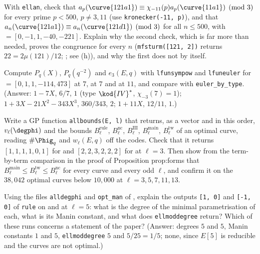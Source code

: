 \begin{sloppypar}
\begin{exercise}\label{exer:computation:sturm}
With \texttt{ellan}, check that $a_p(\curve{121a1})\equiv\chi_{-11}(p)a_p(\curve{11a1})\pmod3$ for every prime $p<500$, $p\ne3,11$ (use \texttt{kronecker(-11, p)}),
and that $a_n(\curve{121a1})\equiv a_n(\curve{121d1})\pmod3$ for all $n\le500$, with  $=[0,-1,1,-40,-221]$. Explain why the second check, which is far
more than needed, proves the congruence for every $n$ (\texttt{mfsturm([121, 2])} returns $22=2\mu(121)/12$; ; see (h)), and why the first does not by
itself.
\end{exercise}

\begin{exercise}\label{exer:computation:euler}
Compute $P_q(X)$, $P_q(q^{-2})$ and $e_3(E,q)$ with \texttt{lfunsympow} and \texttt{lfuneuler} for  $=[0,1,1,-114,473]$ at $7$,  at
$7$ and  at $11$, and compare with \texttt{euler\_by\_type}. (Answer: $1-7X$, $6/7$, $1$ (type $\kod{IV}^*$, $\chi_{-3}(7)=1$); $1+3X-21X^2-343X^3$, $360/343$, $2$;
$1+11X$, $12/11$, $1$.)
\end{exercise}

\begin{exercise}\label{exer:computation:allbounds}
Write a GP function \texttt{allbounds(E, l)} that returns, as a vector and in this order, $v_\ell(\degphi)$ and the bounds $B^{\mathrm{rule}}_\ell$,
$B^{\mathrm{nc}}_\ell$, $B^{\mathrm{III}}_\ell$, $B^{\mathrm{main}}_\ell$, $B^{\mathrm{tw}}_\ell$ of an optimal curve, reading $\#\Phig_q$ and $w_\ell(E,q)$ off the codes. Check that it returns $[1,1,1,1,0,1]$ for  and $[2,2,3,2,2,2]$ for  at $\ell=3$. Then show from the term-by-term comparison in the
proof of Proposition prop:forms that $B^{\mathrm{main}}_\ell\le B^{\mathrm{tw}}_\ell\le B^{\mathrm{nc}}_\ell$ for every curve and every odd $\ell$, and confirm it on the $38{,}042$ optimal
curves below $10{,}000$ at $\ell=3,5,7,11,13$.
\end{exercise}

\begin{exercise}\label{exer:computation:nonoptimal}
Using the files \texttt{alldegphi} and \texttt{opt\_man} of , explain the outputs \texttt{[1, 0]} and \texttt{[-1, 0]} of \texttt{rule} on
 and  at $\ell=5$: what is the degree of the minimal parametrisation of each, what is its Manin constant, and what does
\texttt{ellmoddegree} return? Which of these runs concerns a statement of the paper? (Answer: degrees $5$ and $5$, Manin constants $1$ and $5$,
\texttt{ellmoddegree} $5$ and $5/25=1/5$; none, since $E[5]$ is reducible and the curves are not optimal.)
\end{exercise}


\end{sloppypar}
